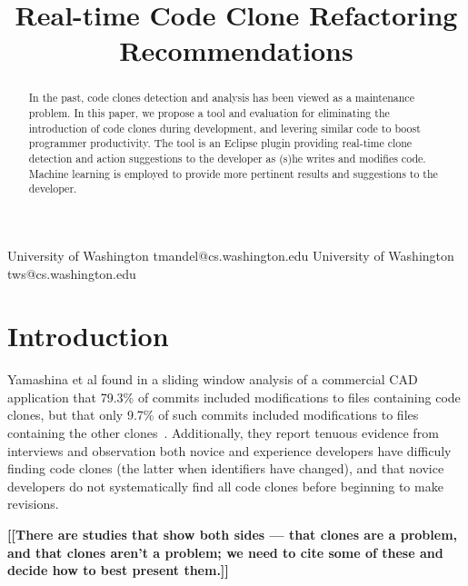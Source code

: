 \documentclass[preprint,10pt]{sigplanconf}
\newcommand{\todo}[1]{{\bfseries [[#1]]}}
\begin{document}
%

\title{Real-time Code Clone Refactoring Recommendations}
           {University of Washington}
           {tmandel@cs.washington.edu}
           {University of Washington}
           {tws@cs.washington.edu}
\maketitle
\begin{abstract}
In the past, code clones detection and analysis has been viewed as a
maintenance problem. In this paper, we propose a tool and evaluation
for eliminating the introduction of code clones during development,
and levering similar code to boost programmer productivity. The tool
is an Eclipse plugin providing real-time clone detection and action
suggestions to the developer as (s)he writes and modifies
code. Machine learning is employed to provide more pertinent results
and suggestions to the developer.
\end{abstract}



\section{Introduction}

Yamashina et al found in a sliding window analysis of a commercial CAD
application that 79.3\% of commits included modifications to files
containing code clones, but that only 9.7\% of such commits included
modifications to files containing the other
clones~\cite{Yamashina2008}. Additionally, they report tenuous
evidence from interviews and observation both novice and experience
developers have difficuly finding code clones (the latter when
identifiers have changed), and that novice developers do not
systematically find all code clones before beginning to make
revisions.

\todo{There are studies that show both sides --- that clones are a
  problem, and that clones aren't a problem; we need to cite some of
  these and decide how to best present them.}
\end{document}
